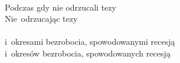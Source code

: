 \documentclass[a4paper,11pt]{article}
\begin{document}
\begin{center}
\end{center}
\noi
{} \\
\Jest Podczas gdy nie odrzucali tezy \\
\Powin  Nie~odrzucając tezy \\
 \\
\Jest i~okresami bezrobocia, spowodowanymi recesją \\
\Powin  i~okresów bezrobocia, spowodowanych recesją \\
\end{document}
